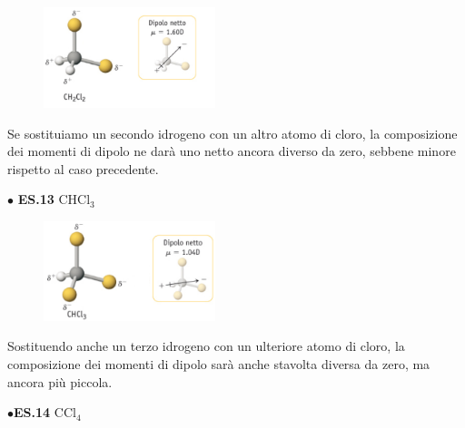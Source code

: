 \hspace{0.5cm}\begin{minipage}{0.2\textwidth}
\begin{figure}[H]
\includegraphics[width=5cm]{immagini/CH_2Cl_2.png}
\end{figure}
\end{minipage} \hfill
\begin{minipage}{0.5\textwidth}
Se sostituiamo un secondo idrogeno con un altro atomo di cloro, la composizione dei momenti di dipolo ne darà uno netto ancora diverso da zero, sebbene minore rispetto al caso precedente.
\end{minipage}

\vspace{0.2cm}$\bullet$ \textbf{ES.13} CHCl$_3$

\hspace{0.5cm}\begin{minipage}{0.2\textwidth}
\begin{figure}[H]
\includegraphics[width=5cm]{immagini/CHCl_3.png}
\end{figure}
\end{minipage} \hfill
\begin{minipage}{0.5\textwidth}
Sostituendo anche un terzo idrogeno con un ulteriore atomo di cloro, la composizione dei momenti di dipolo sarà anche stavolta diversa da zero, ma ancora più piccola.
\end{minipage}

\vspace{0.2cm}$\bullet$\textbf{ES.14} CCl$_4$

